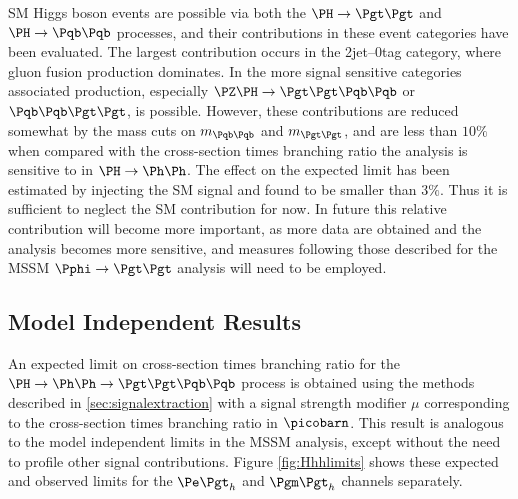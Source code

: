 \ac{SM} Higgs boson events are possible via both the $\PH\to\Pgt\Pgt$
and $\PH\to\Pqb\Pqb$ processes, and their contributions in these event
categories have been evaluated. The largest contribution occurs in the
2jet--0tag category, where gluon fusion production dominates. In the more signal
sensitive categories associated production, especially
$\PZ\PH\to\Pgt\Pgt\Pqb\Pqb$ or $\Pqb\Pqb\Pgt\Pgt$, is possible. 
However, these contributions are
reduced somewhat by the mass cuts on $m_{\Pqb\Pqb}$ and $m_{\Pgt\Pgt}$, and 
are less than $10\%$ when compared with the cross-section times branching ratio
the analysis is sensitive to in $\PH\to\Ph\Ph$. The effect on the expected limit
has been estimated by injecting the \ac{SM} signal and found to be smaller than
$3\%$. Thus it is sufficient to neglect the \ac{SM} contribution for now. In
future this relative contribution will become more important, as more data are
obtained and the analysis becomes more sensitive, and measures following those
described for the \ac{MSSM} $\Pphi\to\Pgt\Pgt$ analysis will need to be
employed. 

\subsection{Model Independent Results}

An expected limit on cross-section times branching ratio for the $\Hhh$
process is obtained using the methods described in \ref{sec:signalextraction}
with a signal strength modifier $\mu$ corresponding to the cross-section times
branching ratio in $\picobarn$. This result is analogous to the model independent
limits in the \ac{MSSM} analysis, except without the need to profile other
signal contributions. Figure \ref{fig:Hhhlimits} shows these
expected and observed limits for the $\etau$ and $\mutau$ channels separately.


